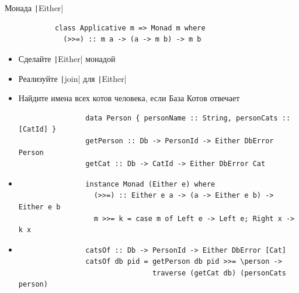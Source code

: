     \begin{frame}[fragile]{Монада \texttt|Either|}
        \begin{verbatim}
            class Applicative m => Monad m where
              (>>=) :: m a -> (a -> m b) -> m b
        \end{verbatim}
        \begin{itemize}
            \item[\todo] Сделайте \texttt|Either| монадой
            \item[\todo] Реализуйте \texttt|join| для \texttt|Either|
            \item[\todo] Найдите имена всех котов человека, если База Котов отвечает
            \begin{verbatim}
                data Person { personName :: String, personCats :: [CatId] }
                getPerson :: Db -> PersonId -> Either DbError Person
                getCat :: Db -> CatId -> Either DbError Cat
            \end{verbatim}
            \item[\answer] \pause
            \begin{verbatim}
                instance Monad (Either e) where
                  (>>=) :: Either e a -> (a -> Either e b) -> Either e b
                  m >>= k = case m of Left e -> Left e; Right x -> k x
            \end{verbatim}
            \item[\answer] \pause
            \begin{verbatim}
                catsOf :: Db -> PersonId -> Either DbError [Cat]
                catsOf db pid = getPerson db pid >>= \person ->
                                traverse (getCat db) (personCats person)
            \end{verbatim}
        \end{itemize}
    \end{frame}


